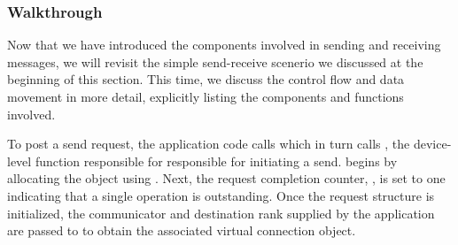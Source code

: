 % 


\subsubsection{Walkthrough}
\label{sssec:walkthrough}


Now that we have introduced the components involved in sending and receiving
messages, we will revisit the simple send-receive scenerio we discussed at the
beginning of this section.  This time, we discuss the control flow and data
movement in more detail, explicitly listing the components and functions
involved.


To post a send request, the application code calls  which in
turn calls , the device-level function responsible for
responsible for initiating a send.   begins by allocating the
 object using .  Next, the
request completion counter, , is set to one indicating
that a single operation is outstanding.  Once the request structure is
initialized, the communicator and destination rank supplied by the application
are passed to  to obtain the associated virtual
connection object.

